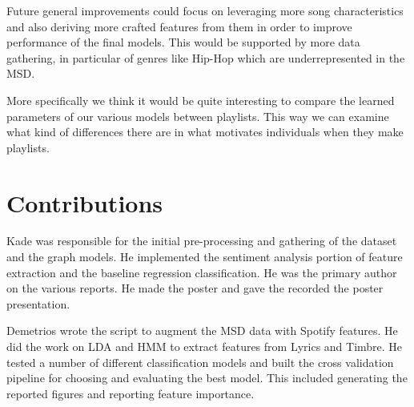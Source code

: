 \documentclass[acmtog]{acmart}
\begin{document}
Future general improvements could focus on leveraging more song characteristics and also deriving more crafted features from them in order to improve performance of the final models. This would be supported by more data gathering, in particular of genres like Hip-Hop which are underrepresented in the MSD.

More specifically we think it would be quite interesting to compare the learned parameters of our various models between playlists. This way we can examine what kind of differences there are in what motivates individuals when they make playlists.


\section{Contributions}
Kade was responsible for the initial pre-processing and gathering of the dataset and the graph models. He implemented the sentiment analysis portion of feature extraction and the baseline regression classification. He was the primary author on the various reports. He made the poster and gave the recorded the poster presentation.

Demetrios wrote the script to augment the MSD data with Spotify features. He did the work on LDA and HMM to extract features from Lyrics and Timbre. He tested a number of different classification models and built the cross validation pipeline for choosing and evaluating the best model. This included generating the reported figures and reporting feature importance.


{}

%
\end{document}

